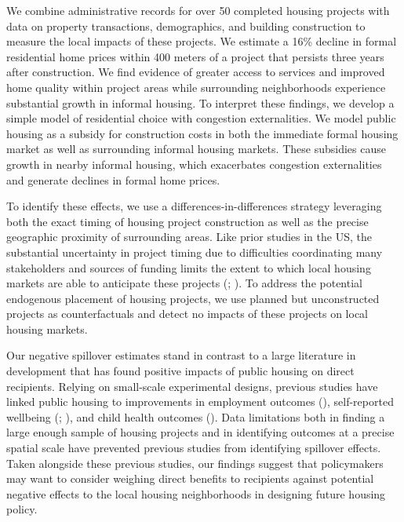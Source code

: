 \documentclass[12pt]{article}
\begin{document}
We combine administrative records for over 50 completed housing projects with data on property transactions, demographics, and building construction to measure the local impacts of these projects.  We estimate a 16\% decline in formal residential home prices within 400 meters of a project that persists three years after construction.  We find evidence of greater access to services and improved home quality within project areas while surrounding neighborhoods experience substantial growth in informal housing.  To interpret these findings, we develop a simple model of residential choice with congestion externalities.  We model public housing as a subsidy for construction costs in both the immediate formal housing market as well as surrounding informal housing markets.  These subsidies cause growth in nearby informal housing, which exacerbates congestion externalities and generate declines in formal home prices.


To identify these effects, we use a differences-in-differences strategy leveraging both the exact timing of housing project construction as well as the precise geographic proximity of surrounding areas.  Like prior studies in the US, the substantial uncertainty in project timing due to difficulties coordinating many stakeholders and sources of funding limits the extent to which local housing markets are able to anticipate these projects (\cite{diamond2016wants}; \cite{serihistory}).  To address the potential endogenous placement of housing projects, we use planned but unconstructed projects as counterfactuals and detect no impacts of these projects on local housing markets.

Our negative spillover estimates stand in contrast to a large literature in development that has found positive impacts of public housing on direct recipients.  Relying on small-scale experimental designs, previous studies have linked public housing to improvements in employment outcomes (\cite{franklin2016enabled}), self-reported wellbeing (\cite{galiani2017shelter}; \cite{devoto2012happiness}), and child health outcomes (\cite{cattaneo2009housing}).  Data limitations both in finding a large enough sample of housing projects and in identifying outcomes at a precise spatial scale have prevented previous studies from identifying spillover effects.  Taken alongside these previous studies, our findings suggest that policymakers may want to consider weighing direct benefits to recipients against potential negative effects to the local housing neighborhoods in designing future housing policy.
\end{document}
